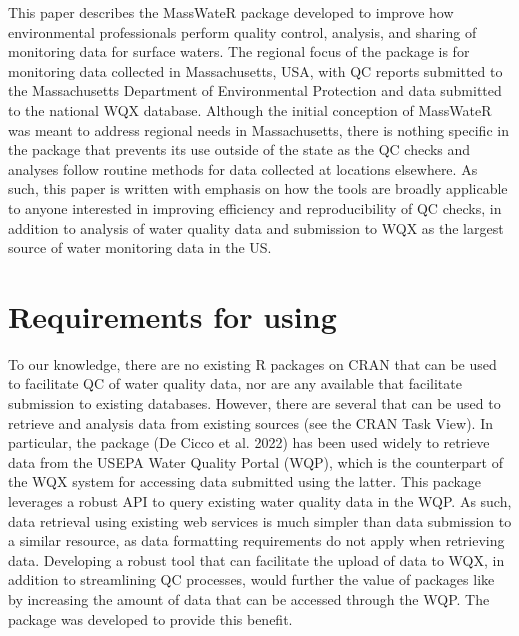 This paper describes the MassWateR package developed to improve how environmental professionals perform quality control, analysis, and sharing of monitoring data for surface waters. The regional focus of the package is for monitoring data collected in Massachusetts, USA, with QC reports submitted to the Massachusetts Department of Environmental Protection and data submitted to the national WQX database. Although the initial conception of MassWateR was meant to address regional needs in Massachusetts, there is nothing specific in the package that prevents its use outside of the state as the QC checks and analyses follow routine methods for data collected at locations elsewhere. As such, this paper is written with emphasis on how the tools are broadly applicable to anyone interested in improving efficiency and reproducibility of QC checks, in addition to analysis of water quality data and submission to WQX as the largest source of water monitoring data in the US.

\hypertarget{requirements-for-using}{%
\section{\texorpdfstring{Requirements for using }{Requirements for using }}\label{requirements-for-using}}

To our knowledge, there are no existing R packages on CRAN that can be used to facilitate QC of water quality data, nor are any available that facilitate submission to existing databases. However, there are several that can be used to retrieve and analysis data from existing sources (see the CRAN  Task View). In particular, the  package (De Cicco et al. 2022) has been used widely to retrieve data from the USEPA Water Quality Portal (WQP), which is the counterpart of the WQX system for accessing data submitted using the latter. This package leverages a robust API to query existing water quality data in the WQP. As such, data retrieval using existing web services is much simpler than data submission to a similar resource, as data formatting requirements do not apply when retrieving data. Developing a robust tool that can facilitate the upload of data to WQX, in addition to streamlining QC processes, would further the value of packages like  by increasing the amount of data that can be accessed through the WQP. The  package was developed to provide this benefit.

